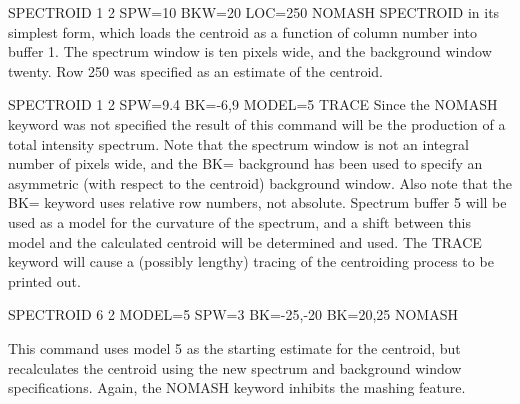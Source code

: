 {\newpage\clearpage
{}%
\begin{example}
  \item[SPECTROID 1 2 SPW=10 BKW=20 LOC=250 NOMASH\hfill]{ SPECTROID in its
       simplest form, which loads the centroid as a function of column
       number into buffer 1. The spectrum window is ten pixels wide, and
       the background window twenty. Row 250 was specified as an estimate
       of the centroid.}
\par
\item[SPECTROID 1 2 SPW=9.4 BK=-6,9 MODEL=5 TRACE\hfill]{ Since the NOMASH
       keyword was not specified the result of this command will be the
       production of a total intensity spectrum.  Note that the spectrum
       window is not an integral number of pixels wide, and the BK=
       background has been used to specify an asymmetric (with respect to
       the centroid) background window.  Also note that the BK= keyword
       uses relative row numbers, not absolute.  Spectrum buffer 5 will be
       used as a model for the curvature of the spectrum, and a shift
       between this model and the calculated centroid will be determined
       and used.  The TRACE keyword will cause a (possibly lengthy) tracing
       of the centroiding process to be printed out.}
\par
\item[SPECTROID 6 2 MODEL=5 SPW=3 BK=-25,-20 BK=20,25 NOMASH\hfill]
  \item{This command uses model 5 as the starting estimate for the
       centroid, but recalculates the centroid using the new spectrum and
       background window specifications.  Again, the NOMASH keyword
       inhibits the mashing feature.}
\end{example}%
\lthtmlfigureZ
\lthtmlcheckvsize\clearpage}

